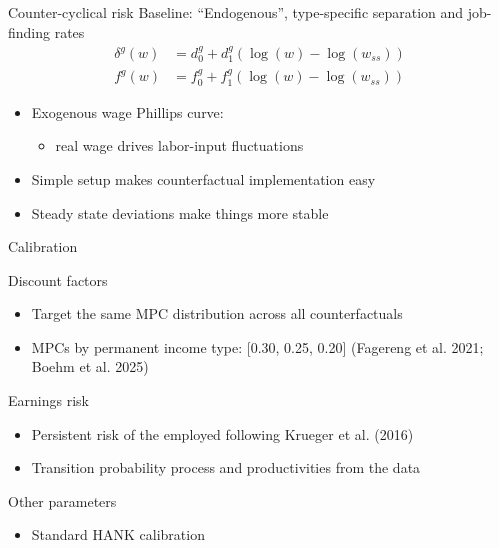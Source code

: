 \documentclass[10pt, aspectratio = 169]{beamer} %
\theoremstyle{mystyle}
\begin{document}
\begin{frame}{Counter-cyclical risk }
Baseline: \alert{``Endogenous'', type-specific separation and job-finding rates } 
\begin{align*}
  \delta^g(w) &= d^g_0 + d^g_1 \left(\log(w)-\log(w_{ss})\right) \\
  f^g(w) &= f^g_0 + f^g_1 \left(\log(w)-\log(w_{ss})\right) 
\end{align*}
\vspace{-.5cm}
\begin{itemize}
    \item Exogenous wage Phillips curve: 
    \begin{itemize}
        \item real wage drives labor-input fluctuations
    \end{itemize}
    \item Simple setup makes counterfactual implementation easy 
    \item Steady state deviations make things more stable
\end{itemize}

\end{frame}

\begin{frame}{Calibration}\label{calibration}

\alert{Discount factors} 
\begin{itemize}
    \item Target the same MPC distribution across all counterfactuals \hyperlink{table3}{}
    \item MPCs by permanent income type: [0.30, 0.25, 0.20] (Fagereng et al. 2021; Boehm et al. 2025)
\end{itemize}

\alert{Earnings risk}
\begin{itemize}
    \item Persistent risk of the employed following Krueger et al. (2016) 
    \item Transition probability process and productivities from the data \hyperlink{table2}{}
\end{itemize}

\alert{Other parameters}
\begin{itemize}
    \item Standard HANK calibration \hyperlink{table1}{}
\end{itemize}

\end{frame}
\end{document}
